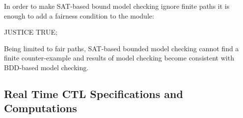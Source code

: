 In order to make SAT-based bound model checking ignore finite paths
it is enough to add a fairness condition to the  module:
%
\begin{nusmvCode}
JUSTICE TRUE;
\end{nusmvCode}
%
Being limited to fair paths, SAT-based bounded model checking cannot
find a finite counter-example and results of model checking become
consistent with BDD-based model checking.

\subsection{Real Time CTL Specifications and Computations}
\label{Real Time CTL Specifications and Computations}

